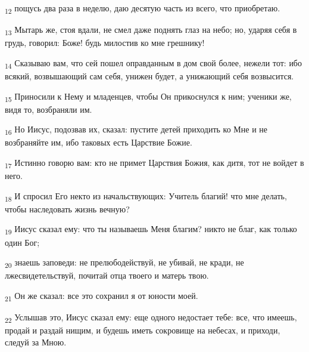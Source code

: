 \begin{tcolorbox}
\textsubscript{12} пощусь два раза в неделю, даю десятую часть из всего, что приобретаю.
\end{tcolorbox}
\begin{tcolorbox}
\textsubscript{13} Мытарь же, стоя вдали, не смел даже поднять глаз на небо; но, ударяя себя в грудь, говорил: Боже! будь милостив ко мне грешнику!
\end{tcolorbox}
\begin{tcolorbox}
\textsubscript{14} Сказываю вам, что сей пошел оправданным в дом свой более, нежели тот: ибо всякий, возвышающий сам себя, унижен будет, а унижающий себя возвысится.
\end{tcolorbox}
\begin{tcolorbox}
\textsubscript{15} Приносили к Нему и младенцев, чтобы Он прикоснулся к ним; ученики же, видя то, возбраняли им.
\end{tcolorbox}
\begin{tcolorbox}
\textsubscript{16} Но Иисус, подозвав их, сказал: пустите детей приходить ко Мне и не возбраняйте им, ибо таковых есть Царствие Божие.
\end{tcolorbox}
\begin{tcolorbox}
\textsubscript{17} Истинно говорю вам: кто не примет Царствия Божия, как дитя, тот не войдет в него.
\end{tcolorbox}
\begin{tcolorbox}
\textsubscript{18} И спросил Его некто из начальствующих: Учитель благий! что мне делать, чтобы наследовать жизнь вечную?
\end{tcolorbox}
\begin{tcolorbox}
\textsubscript{19} Иисус сказал ему: что ты называешь Меня благим? никто не благ, как только один Бог;
\end{tcolorbox}
\begin{tcolorbox}
\textsubscript{20} знаешь заповеди: не прелюбодействуй, не убивай, не кради, не лжесвидетельствуй, почитай отца твоего и матерь твою.
\end{tcolorbox}
\begin{tcolorbox}
\textsubscript{21} Он же сказал: все это сохранил я от юности моей.
\end{tcolorbox}
\begin{tcolorbox}
\textsubscript{22} Услышав это, Иисус сказал ему: еще одного недостает тебе: все, что имеешь, продай и раздай нищим, и будешь иметь сокровище на небесах, и приходи, следуй за Мною.
\end{tcolorbox}
